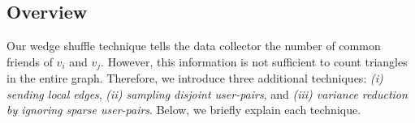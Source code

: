 \subsection{Overview}
\label{sub:triangle_overview}
Our wedge shuffle technique tells the data collector the number of common friends of $v_i$ and $v_j$.
However, this information is not sufficient to count triangles in the entire graph.
Therefore, we introduce
three additional techniques:
\textit{(i) sending local edges},
\textit{(ii) sampling disjoint user-pairs},
and
\textit{(iii) variance reduction by ignoring sparse user-pairs}.
Below, we briefly explain each technique.

